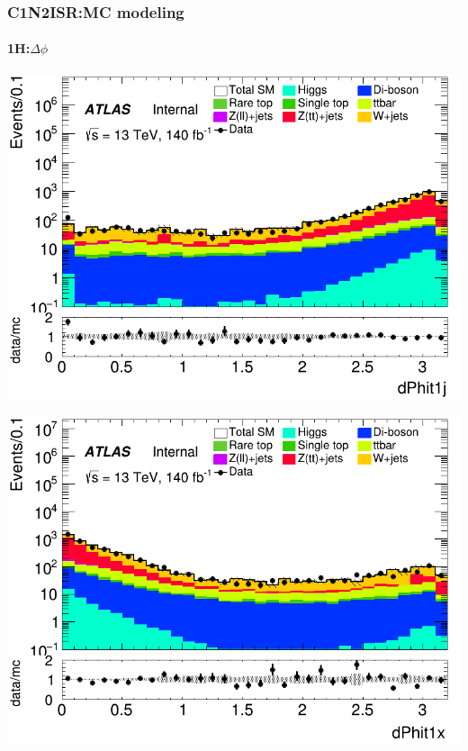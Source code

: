 \documentclass[usenames,dvipsnames]{beamer}
\begin{document}
\begin{frame}
\frametitle{C1N2ISR:MC modeling}
\framesubtitle{1H:\quad $\Delta\phi$}
    \begin{minipage}{0.32\textwidth}
        \centering
        \includegraphics[width=\textwidth]{graphics/H_met/H_met_dPhit1j.png}
    \end{minipage}
    \hfill
    \begin{minipage}{0.32\textwidth}
        \centering
        \includegraphics[width=\textwidth]{graphics/H_met/H_met_dPhit1x.png}
    \end{minipage}
    \hfill
    \begin{minipage}{0.32\textwidth}
        \centering

\end{minipage}
\end{frame}
\end{document}
